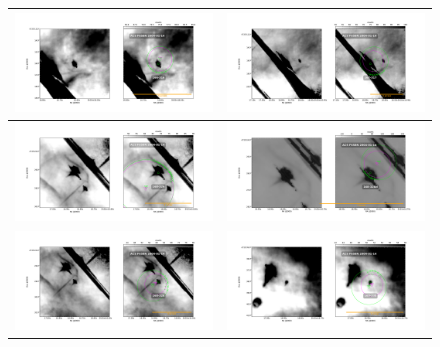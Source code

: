 \begin{figure}[htp]
\begin{tabular}{|l|l|}
    \includegraphics[width=0.47\linewidth,  trim=60 50 100 50, clip]{j8oc01010_wcs/166-316-Bally_01-images.pdf}
   &\includegraphics[width=0.47\linewidth,  trim=60 50 100 50, clip]{j8oc01010_wcs/167-317-Bally_01-images.pdf}\\ \hline
   \includegraphics[width=0.47\linewidth,  trim=60 50 100 50, clip]{j8oc01010_wcs/168-326-Bally_01-images.pdf}
   &\includegraphics[width=0.47\linewidth,  trim=60 50 100 50, clip]{j8oc01010_wcs/168-326N-Bally_01-images.pdf}\\ \hline
   \includegraphics[width=0.47\linewidth,  trim=60 50 100 50, clip]{j8oc01010_wcs/168-328-Bally_01-images.pdf}
 &\includegraphics[width=0.47\linewidth,  trim=60 50 100 50, clip]{j8oc01010_wcs/169-338-Bally_01-images.pdf}\\ \hline
   
 \end{tabular}
\end{figure}

